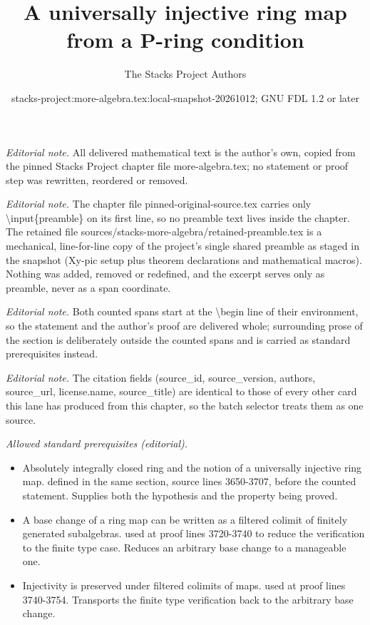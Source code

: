 \documentclass[10pt,a4paper]{amsart}
\title{A universally injective ring map from a P-ring condition}
\author{The Stacks Project Authors}
\date{stacks-project:more-algebra.tex:local-snapshot-20261012; GNU FDL 1.2 or later}
\theoremstyle{plain}
\theoremstyle{definition}
\theoremstyle{remark}
\numberwithin{equation}{subsection}
\begin{document}
\maketitle
\setcounter{subsection}{1}
\noindent\textit{Editorial note.} All delivered mathematical text is the author's own, copied from the pinned Stacks Project chapter file more-algebra.tex; no statement or proof step was rewritten, reordered or removed.\par\medskip
\noindent\textit{Editorial note.} The chapter file pinned-original-source.tex carries only \textbackslash{}input\{preamble\} on its first line, so no preamble text lives inside the chapter. The retained file sources/stacks-more-algebra/retained-preamble.tex is a mechanical, line-for-line copy of the project's single shared preamble as staged in the snapshot (Xy-pic setup plus theorem declarations and mathematical macros). Nothing was added, removed or redefined, and the excerpt serves only as preamble, never as a span coordinate.\par\medskip
\noindent\textit{Editorial note.} Both counted spans start at the \textbackslash{}begin line of their environment, so the statement and the author's proof are delivered whole; surrounding prose of the section is deliberately outside the counted spans and is carried as standard prerequisites instead.\par\medskip
\noindent\textit{Editorial note.} The citation fields (source\_id, source\_version, authors, source\_url, license.name, source\_title) are identical to those of every other card this lane has produced from this chapter, so the batch selector treats them as one source.\par\medskip
\noindent\textit{Allowed standard prerequisites (editorial).}\begin{itemize}
\item Absolutely integrally closed ring and the notion of a universally injective ring map. defined in the same section, source lines 3650-3707, before the counted statement. Supplies both the hypothesis and the property being proved.
\item A base change of a ring map can be written as a filtered colimit of finitely generated subalgebras. used at proof lines 3720-3740 to reduce the verification to the finite type case. Reduces an arbitrary base change to a manageable one.
\item Injectivity is preserved under filtered colimits of maps. used at proof lines 3740-3754. Transports the finite type verification back to the arbitrary base change.
\end{itemize}\medskip
\end{document}
